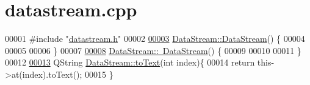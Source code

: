 \hypertarget{datastream_8cpp_source}{}\section{datastream.\+cpp}
\label{datastream_8cpp_source}

\begin{DoxyCode}
00001 \textcolor{preprocessor}{#include "\hyperlink{datastream_8h}{datastream.h}"}
00002 
\hypertarget{datastream_8cpp_source.tex_l00003}{}\hyperlink{classDataStream_aadb8f27fe18a349a25b2cd656d686f92}{00003}     \hyperlink{classDataStream_aadb8f27fe18a349a25b2cd656d686f92}{DataStream::DataStream}() \{
00004 
00005 
00006     \}
00007 
\hypertarget{datastream_8cpp_source.tex_l00008}{}\hyperlink{classDataStream_ab1ab2421685bd8ee669ec94d3b0239b8}{00008}     \hyperlink{classDataStream_ab1ab2421685bd8ee669ec94d3b0239b8}{DataStream::~DataStream}() \{
00009 
00010 
00011     \}
00012 
\hypertarget{datastream_8cpp_source.tex_l00013}{}\hyperlink{classDataStream_a4876a67f0408d22a85ab785a138bcf35}{00013}     QString \hyperlink{classDataStream_a4876a67f0408d22a85ab785a138bcf35}{DataStream::toText}(\textcolor{keywordtype}{int} index)\{
00014         \textcolor{keywordflow}{return} this->at(index).toText();
00015     \}
\end{DoxyCode}
